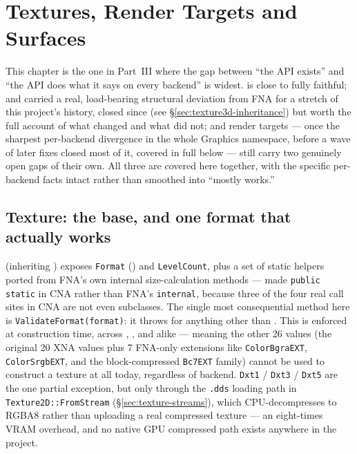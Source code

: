 \chapter{Textures, Render Targets and Surfaces}
\label{ch:textures-rendertargets}

This chapter is the one in Part~III where the gap between ``the API exists'' and ``the API
does what it says on every backend'' is widest.  is close to fully
faithful;  and  carried a real, load-bearing
structural deviation from FNA for a stretch of this project's history, closed since (see
\S\ref{sec:texture3d-inheritance}) but worth the full account of what changed and what did
not; and render targets --- once the sharpest per-backend divergence in the whole Graphics
namespace, before a wave of later fixes closed most of it, covered in full below --- still
carry two genuinely open gaps of their own. All three are covered here together, with the
specific per-backend facts intact rather than smoothed into ``mostly works.''

\section{Texture: the base, and one format that actually works}

 (inheriting ) exposes \texttt{Format}
() and \texttt{LevelCount}, plus a set of static helpers ported from
FNA's own internal size-calculation methods --- made \texttt{public static} in CNA rather
than FNA's \texttt{internal}, because three of the four real call sites in CNA are not even
 subclasses. The single most consequential method here is
\texttt{ValidateFormat(format)}: it throws for anything other than
. This is enforced at construction time, across
, , and  alike --- meaning the
other 26  values (the original 20 XNA values plus 7 FNA-only
extensions like \texttt{ColorBgraEXT}, \texttt{ColorSrgbEXT}, and the block-compressed
\texttt{Bc7EXT} family) cannot be used to construct a texture at all today, regardless of
backend. \texttt{Dxt1} / \texttt{Dxt3} / \texttt{Dxt5} are the one partial exception, but only
through the \texttt{.dds} loading path in \texttt{Texture2D::FromStream}
(\S\ref{sec:texture-streams}), which CPU-decompresses to RGBA8 rather than uploading a real
compressed texture --- an eight-times VRAM overhead, and no native GPU compressed path exists
anywhere in the project.

